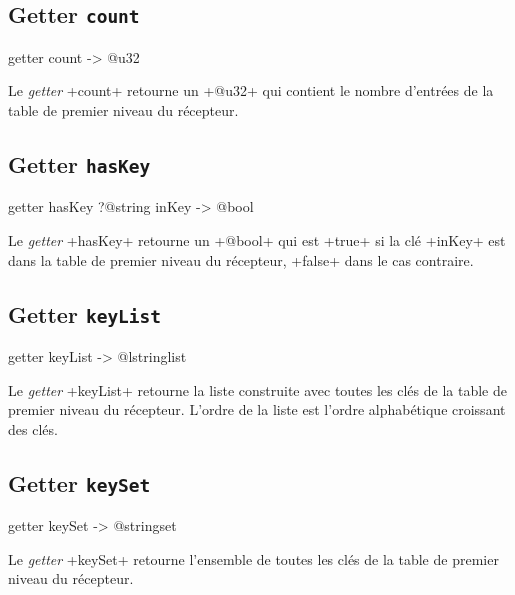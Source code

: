 \subsection{Getter \texttt{count}}

\begin{galgas4}
getter count -> @u32
\end{galgas4}


Le \emph{getter} \ggsq+count+ retourne un \ggsq+@u32+ qui contient le nombre d'entrées de la table de premier niveau du récepteur.



\subsection{Getter \texttt{hasKey}}

\begin{galgas4}
getter hasKey ?@string inKey -> @bool
\end{galgas4}


Le \emph{getter} \ggsq+hasKey+ retourne un \ggsq+@bool+ qui est \ggsq+true+ si la clé \ggsq+inKey+ est dans la table de premier niveau du récepteur, \ggsq+false+ dans le cas contraire.



\subsection{Getter \texttt{keyList}}

\begin{galgas4}
getter keyList -> @lstringlist
\end{galgas4}


Le \emph{getter} \ggsq+keyList+ retourne la liste construite avec toutes les clés de la table de premier niveau du récepteur. L'ordre de la liste est l'ordre alphabétique croissant des clés.



\subsection{Getter \texttt{keySet}}

\begin{galgas4}
getter keySet -> @stringset
\end{galgas4}


Le \emph{getter} \ggsq+keySet+ retourne l'ensemble de toutes les clés de la table de premier niveau du récepteur.





